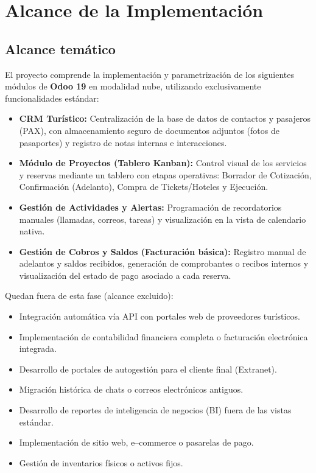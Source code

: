 \section{Alcance de la Implementación}

\subsection{Alcance temático}

El proyecto comprende la implementación y parametrización de los siguientes módulos de \textbf{Odoo 19} en modalidad nube, utilizando exclusivamente funcionalidades estándar:

\begin{itemize}
    \item \textbf{CRM Turístico:} Centralización de la base de datos de contactos y pasajeros (PAX), con almacenamiento seguro de documentos adjuntos (fotos de pasaportes) y registro de notas internas e interacciones.
    \item \textbf{Módulo de Proyectos (Tablero Kanban):} Control visual de los servicios y reservas mediante un tablero con etapas operativas: Borrador de Cotización, Confirmación (Adelanto), Compra de Tickets/Hoteles y Ejecución.
    \item \textbf{Gestión de Actividades y Alertas:} Programación de recordatorios manuales (llamadas, correos, tareas) y visualización en la vista de calendario nativa.
    \item \textbf{Gestión de Cobros y Saldos (Facturación básica):} Registro manual de adelantos y saldos recibidos, generación de comprobantes o recibos internos y visualización del estado de pago asociado a cada reserva.
\end{itemize}

Quedan fuera de esta fase (alcance excluido):

\begin{itemize}
    \item Integración automática vía API con portales web de proveedores turísticos.
    \item Implementación de contabilidad financiera completa o facturación electrónica integrada.
    \item Desarrollo de portales de autogestión para el cliente final (Extranet).
    \item Migración histórica de chats o correos electrónicos antiguos.
    \item Desarrollo de reportes de inteligencia de negocios (BI) fuera de las vistas estándar.
    \item Implementación de sitio web, e--commerce o pasarelas de pago.
    \item Gestión de inventarios físicos o activos fijos.
\end{itemize}

